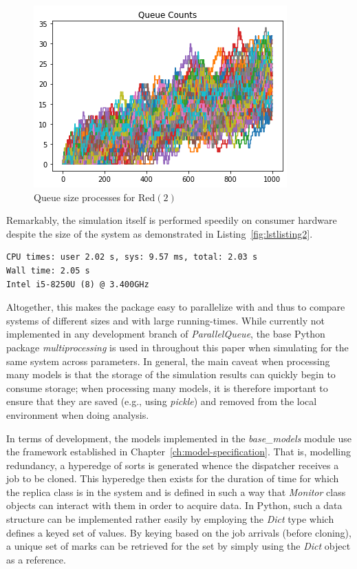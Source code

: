 \begin{figure}
    \centering
    \includegraphics[scale=0.8]{redundancy}
    \caption{Queue size processes for $\text{Red}(2)$}
    \label{fig:redpic}

    \medskip
\end{figure}

Remarkably, the simulation itself is performed speedily on consumer hardware despite the size of the system as demonstrated in Listing~\ref{fig:lstlisting2}.
\begin{lstlisting}[label={fig:lstlisting2},style=mystyle, caption={Runtime Statistics Using the Master ParallelQueue Branch}]
CPU times: user 2.02 s, sys: 9.57 ms, total: 2.03 s
Wall time: 2.05 s
Intel i5-8250U (8) @ 3.400GHz
\end{lstlisting}


Altogether, this makes the package easy to parallelize with and thus to compare systems of different sizes
and with large running-times.
While currently not implemented in any development branch of \textit{ParallelQueue}, the base Python package
\textit{multiprocessing} is used in throughout this paper when simulating for the same system across parameters.
In general, the main caveat when processing many models is that the storage of the simulation results can quickly begin
to consume storage;
when processing many models, it is therefore important to ensure that they are saved (e.g., using \textit{pickle}) and removed from
the local environment when doing analysis.

In terms of development, the models implemented in the \textit{base\_models} module use the framework established in Chapter~\ref{ch:model-specification}.
That is, modelling redundancy, a hyperedge of sorts is generated whence the dispatcher
receives a job to be cloned.
This hyperedge then exists for the duration of time for which the replica class is in the system and is defined in such
a way that \textit{Monitor} class objects can interact with them in order to acquire data.
In Python, such a data structure can be implemented rather easily by employing the \textit{Dict} type which defines
a keyed set of values.
By keying based on the job arrivals (before cloning), a unique set of marks can be retrieved for the set by simply using
the \textit{Dict} object as a reference.


